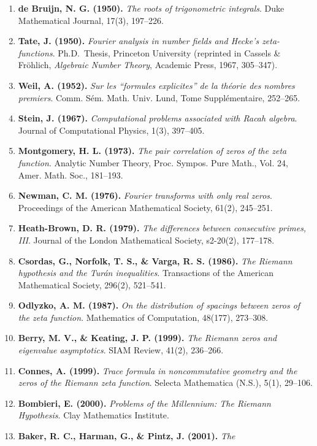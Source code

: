 \documentclass[
  11pt,
]{article}
\begin{document}
\begin{enumerate}
  Oslo I, 10, 1--59.
\item
  \textbf{de Bruijn, N. G. (1950).} \emph{The roots of trigonometric
  integrals}. Duke Mathematical Journal, 17(3), 197--226.
\item
  \textbf{Tate, J. (1950).} \emph{Fourier analysis in number fields and
  Hecke's zeta-functions}. Ph.D.~Thesis, Princeton University (reprinted
  in Cassels \& Fröhlich, \emph{Algebraic Number Theory}, Academic
  Press, 1967, 305--347).
\item
  \textbf{Weil, A. (1952).} \emph{Sur les ``formules explicites'' de la
  théorie des nombres premiers}. Comm. Sém. Math. Univ. Lund, Tome
  Supplémentaire, 252--265.
\item
  \textbf{Stein, J. (1967).} \emph{Computational problems associated
  with Racah algebra}. Journal of Computational Physics, 1(3), 397--405.
\item
  \textbf{Montgomery, H. L. (1973).} \emph{The pair correlation of zeros
  of the zeta function}. Analytic Number Theory, Proc. Sympos. Pure
  Math., Vol. 24, Amer. Math. Soc., 181--193.
\item
  \textbf{Newman, C. M. (1976).} \emph{Fourier transforms with only real
  zeros}. Proceedings of the American Mathematical Society, 61(2),
  245--251.
\item
  \textbf{Heath-Brown, D. R. (1979).} \emph{The differences between
  consecutive primes, III}. Journal of the London Mathematical Society,
  s2-20(2), 177--178.
\item
  \textbf{Csordas, G., Norfolk, T. S., \& Varga, R. S. (1986).}
  \emph{The Riemann hypothesis and the Turán inequalities}. Transactions
  of the American Mathematical Society, 296(2), 521--541.
\item
  \textbf{Odlyzko, A. M. (1987).} \emph{On the distribution of spacings
  between zeros of the zeta function}. Mathematics of Computation,
  48(177), 273--308.
\item
  \textbf{Berry, M. V., \& Keating, J. P. (1999).} \emph{The Riemann
  zeros and eigenvalue asymptotics}. SIAM Review, 41(2), 236--266.
\item
  \textbf{Connes, A. (1999).} \emph{Trace formula in noncommutative
  geometry and the zeros of the Riemann zeta function}. Selecta
  Mathematica (N.S.), 5(1), 29--106.
\item
  \textbf{Bombieri, E. (2000).} \emph{Problems of the Millennium: The
  Riemann Hypothesis}. Clay Mathematics Institute.
\item
  \textbf{Baker, R. C., Harman, G., \& Pintz, J. (2001).} \emph{The
}
\end{enumerate}
\end{document}
